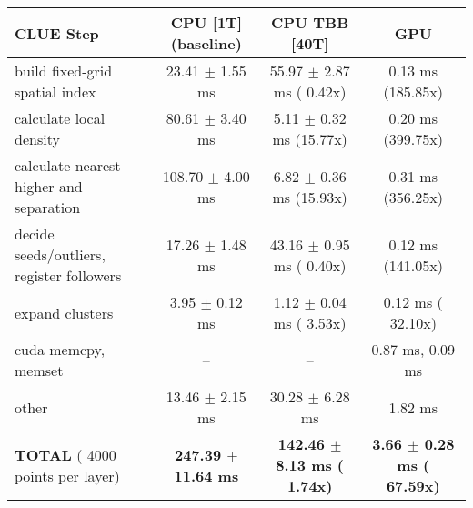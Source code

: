     \begin{tabular}{l|c|c|c}
    \hline
    CLUE Step                                 & CPU [1T] (baseline)         & CPU TBB [40T]                         & GPU                       \\ \hline
    build fixed-grid spatial index            &  23.41 $\pm$  1.55 ms       &  55.97 $\pm$  2.87 ms ( 0.42x)        &   0.13 ms (185.85x)       \\
    calculate local density                   &  80.61 $\pm$  3.40 ms       &   5.11 $\pm$  0.32 ms (15.77x)        &   0.20 ms (399.75x)       \\
    calculate nearest-higher and separation   & 108.70 $\pm$  4.00 ms       &   6.82 $\pm$  0.36 ms (15.93x)        &   0.31 ms (356.25x)       \\
    decide seeds/outliers, register followers &  17.26 $\pm$  1.48 ms       &  43.16 $\pm$  0.95 ms ( 0.40x)        &   0.12 ms (141.05x)       \\
    expand clusters                           &   3.95 $\pm$  0.12 ms       &   1.12 $\pm$  0.04 ms ( 3.53x)        &   0.12 ms ( 32.10x)       \\ \hline
    cuda memcpy, memset                       & --                          & --                                    &   0.87 ms,   0.09 ms      \\ 
    other                                     &  13.46 $\pm$  2.15 ms       &  30.28 $\pm$  6.28 ms                 &   1.82 ms                 \\ \hline
    \textbf{TOTAL} ( 4000 points per layer)   & \textbf{247.39 $\pm$ 11.64 ms} & \textbf{142.46 $\pm$  8.13 ms ( 1.74x)} & \textbf{  3.66 $\pm$  0.28 ms ( 67.59x)}  \\
    \hline 
    \end{tabular}
    \linebreak


